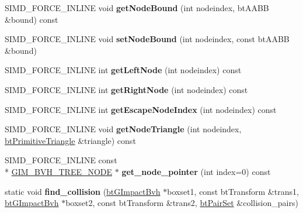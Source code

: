 \begin{DoxyCompactItemize}
\item 
\hypertarget{classbt_g_impact_bvh_aabbfc365bb5c8acf2da9b4f5dbe07b2d}{S\+I\+M\+D\+\_\+\+F\+O\+R\+C\+E\+\_\+\+I\+N\+L\+I\+N\+E void {\bfseries get\+Node\+Bound} (int nodeindex, bt\+A\+A\+B\+B \&bound) const }\label{classbt_g_impact_bvh_aabbfc365bb5c8acf2da9b4f5dbe07b2d}

\item 
\hypertarget{classbt_g_impact_bvh_a859ecdad42780d5eef09f9825f179640}{S\+I\+M\+D\+\_\+\+F\+O\+R\+C\+E\+\_\+\+I\+N\+L\+I\+N\+E void {\bfseries set\+Node\+Bound} (int nodeindex, const bt\+A\+A\+B\+B \&bound)}\label{classbt_g_impact_bvh_a859ecdad42780d5eef09f9825f179640}

\item 
\hypertarget{classbt_g_impact_bvh_ab578849a6174ed92b9e26e5aaa6f08c6}{S\+I\+M\+D\+\_\+\+F\+O\+R\+C\+E\+\_\+\+I\+N\+L\+I\+N\+E int {\bfseries get\+Left\+Node} (int nodeindex) const }\label{classbt_g_impact_bvh_ab578849a6174ed92b9e26e5aaa6f08c6}

\item 
\hypertarget{classbt_g_impact_bvh_aa26ba3d2bc34f43178896dd2efdfeac6}{S\+I\+M\+D\+\_\+\+F\+O\+R\+C\+E\+\_\+\+I\+N\+L\+I\+N\+E int {\bfseries get\+Right\+Node} (int nodeindex) const }\label{classbt_g_impact_bvh_aa26ba3d2bc34f43178896dd2efdfeac6}

\item 
\hypertarget{classbt_g_impact_bvh_a27a763cabce58d47467db5e057423096}{S\+I\+M\+D\+\_\+\+F\+O\+R\+C\+E\+\_\+\+I\+N\+L\+I\+N\+E int {\bfseries get\+Escape\+Node\+Index} (int nodeindex) const }\label{classbt_g_impact_bvh_a27a763cabce58d47467db5e057423096}

\item 
\hypertarget{classbt_g_impact_bvh_a2c8c2e229d0b1828b5f4b749a1215a4c}{S\+I\+M\+D\+\_\+\+F\+O\+R\+C\+E\+\_\+\+I\+N\+L\+I\+N\+E void {\bfseries get\+Node\+Triangle} (int nodeindex, \hyperlink{classbt_primitive_triangle}{bt\+Primitive\+Triangle} \&triangle) const }\label{classbt_g_impact_bvh_a2c8c2e229d0b1828b5f4b749a1215a4c}

\item 
\hypertarget{classbt_g_impact_bvh_a4fedb1501c685120f30480f455143133}{S\+I\+M\+D\+\_\+\+F\+O\+R\+C\+E\+\_\+\+I\+N\+L\+I\+N\+E const \\*
\hyperlink{class_g_i_m___b_v_h___t_r_e_e___n_o_d_e}{G\+I\+M\+\_\+\+B\+V\+H\+\_\+\+T\+R\+E\+E\+\_\+\+N\+O\+D\+E} $\ast$ {\bfseries get\+\_\+node\+\_\+pointer} (int index=0) const }\label{classbt_g_impact_bvh_a4fedb1501c685120f30480f455143133}

\item 
\hypertarget{classbt_g_impact_bvh_afae64cf5751011ae6f5e449fc6145ffd}{static void {\bfseries find\+\_\+collision} (\hyperlink{classbt_g_impact_bvh}{bt\+G\+Impact\+Bvh} $\ast$boxset1, const bt\+Transform \&trans1, \hyperlink{classbt_g_impact_bvh}{bt\+G\+Impact\+Bvh} $\ast$boxset2, const bt\+Transform \&trans2, \hyperlink{classbt_pair_set}{bt\+Pair\+Set} \&collision\+\_\+pairs)}\label{classbt_g_impact_bvh_afae64cf5751011ae6f5e449fc6145ffd}

\end{DoxyCompactItemize}


